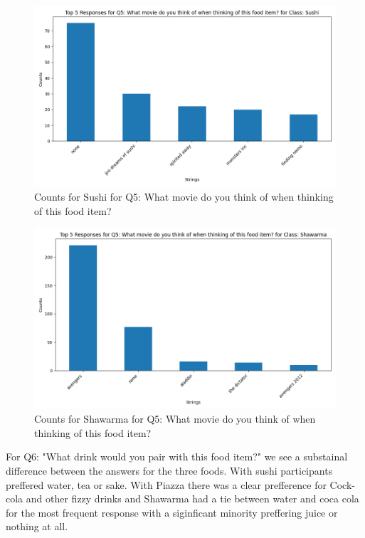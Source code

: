 \begin{figure}[h]
    \centerline{\includegraphics[width=\columnwidth]{data/top_5_responses_Q5_Sushi.png}}
    \caption{Counts for Sushi for Q5: What movie do you think of when thinking of this food item?}
    \label{f:sushi_q5}
\end{figure}
\begin{figure}[h]
    \centerline{\includegraphics[width=\columnwidth]{data/top_5_responses_Q5_Shawarma.png}}
    \caption{Counts for Shawarma for Q5: What movie do you think of when thinking of this food item?}
    \label{f:shawarma_q6}
\end{figure}


For Q6: "What drink would you pair with this food item?" we see a substainal difference between the answers for the three foods.
With sushi participants preffered water, tea or sake. With Piazza there was a clear prefference for Cock-cola and other fizzy drinks
and Shawarma had a tie between water and coca cola for the most frequent response with a siginficant minority preffering juice or
nothing at all.

